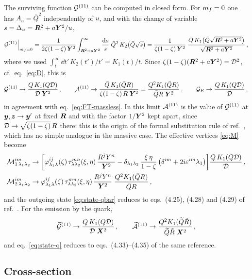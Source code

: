 The surviving function $\mathcal{G}^{(11)}$ can be computed in closed form. For $m_f=0$ one has
$A_u=\bar Q^2$ independently of $u$, and with the change of variable $s=\Delta_u=\bm{R}^2+a\bm{Y}^2/u$,
\begin{equation}
\mathcal{G}^{(11)}\Big|_{m_f=0}=\frac{1}{2\zeta(1-\zeta)\,\bm{Y}^2}\int_{\bm{R}^2+a\bm{Y}^2}^\infty\frac{{\rm d} s}{s}\;\bar Q^2\,
K_2\big(\bar Q\sqrt s\big)
=\frac{1}{\zeta(1-\zeta)\,\bm{Y}^2}\;\frac{\bar Q\,K_1\big(\bar Q\sqrt{\bm{R}^2+a\bm{Y}^2}\big)}{\sqrt{\bm{R}^2+a\bm{Y}^2}}\,,
\end{equation}
where we used $\int_t^\infty\dd t'\,K_2(t')/t'=K_1(t)/t$. Since $\zeta(1-\zeta)(\bm{R}^2+a\bm{Y}^2)=\mathcal{D}^2$, cf.\
eq.~\eqref{eq:D}, this is
\begin{equation}
\mathcal{G}^{(11)}\to\frac{Q\,K_1(Q\mathcal{D})}{\mathcal{D}\;\bm{Y}^2}\,,\qquad
\mathcal{A}^{(11)}\to\frac{\bar Q\,K_1(\bar QR)}{\zeta(1-\zeta)\,R\;\bm{Y}^2}=\frac{Q^2K_1(\bar QR)}{\bar QR\;\bm{Y}^2}\,,\qquad
\mathcal{G}_E\to\frac{Q\,K_1(Q\mathcal{D})}{\mathcal{D}}\,,
\label{eq:massless-fns}
\end{equation}
in agreement with eq.~\eqref{eq:FT-massless}. In this limit $\mathcal{A}^{(11)}$ is the value of $\mathcal{G}^{(11)}$ at
$\bm{y},\bm{z}\to\bm{y}'$ at fixed $\bm{R}$ and with the factor $1/\bm{Y}^2$ kept apart, since $\mathcal{D}\to\sqrt{\zeta(1-\zeta)}\,R$
there: this is the origin of the formal substitution rule of ref.~\cite{Iancu:2022gpw}, which has no
simple analogue in the massive case. The effective vertices \eqref{eq:M} become
\begin{align}
\mathcal{M}^{im}_{1\,\lambda_1\lambda_2}&\to\bigg[\varphi^{ij}_{\lambda_1\lambda}(\zeta)\,\tau^{mn}_{\lambda\lambda_2}(\xi,\eta)\,
\frac{R^jY^n}{\bm{Y}^2}-\delta_{\lambda_1\lambda_2}\,\frac{\xi\,\eta}{1-\zeta}\,\big(\delta^{im}+2i\varepsilon^{im}\lambda_1\big)\bigg]
\frac{Q\,K_1(Q\mathcal{D})}{\mathcal{D}}\,,
\nonumber\\
\mathcal{M}^{im}_{2\,\lambda_1\lambda_2}&\to\varphi^{ij}_{\lambda_1\lambda}(\zeta)\,\tau^{mn}_{\lambda\lambda_2}(\xi,\eta)\,
\frac{R^jY^n}{\bm{Y}^2}\;\frac{Q^2K_1(\bar QR)}{\bar QR}\,,
\label{eq:M-massless}
\end{align}
and the outgoing state \eqref{eq:state-qbar} reduces to eqs.~(4.25), (4.28) and (4.29) of
ref.~\cite{Iancu:2022gpw}. For the emission by the quark,
\begin{equation}
\widetilde{\mathcal{G}}^{(11)}\to\frac{Q\,K_1(Q\mathcal{D})}{\mathcal{D}\;\bm{X}^2}\,,\qquad
\widetilde{\mathcal{A}}^{(11)}\to\frac{Q^2K_1(\widetilde Q\tilde R)}{\widetilde Q\tilde R\;\bm{X}^2}\,,
\end{equation}
and eq.~\eqref{eq:state-q} reduces to eqs.~(4.33)--(4.35) of the same reference.

\subsection{Cross-section}

